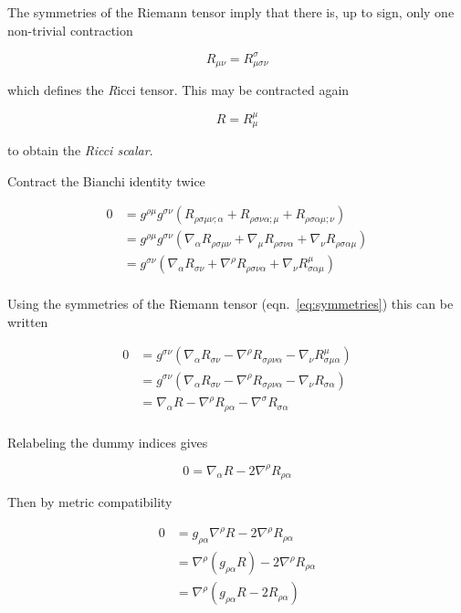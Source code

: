 The symmetries of the Riemann tensor imply that there is, up to sign,
only one non-trivial contraction

\begin{equation}
R_{\mu\nu} = R^\sigma_{\mu\sigma\nu}
\end{equation}

which defines the {\emph Ricci tensor}.  This may be contracted again

\begin{equation}
R = R^\mu_\mu
\end{equation}

to obtain the \emph{Ricci scalar}.


Contract the Bianchi identity twice

\begin{align*}
0 &=
g^{\rho\mu} g^{\sigma\nu}
\left(R_{\rho\sigma\mu\nu;\alpha}
+R_{\rho\sigma\nu\alpha;\mu}
+R_{\rho\sigma\alpha\mu;\nu}\right) \\
&= g^{\rho\mu} g^{\sigma\nu}
\left(\nabla_\alpha R_{\rho\sigma\mu\nu}
+ \nabla_\mu R_{\rho\sigma\nu\alpha}
+ \nabla_\nu R_{\rho\sigma\alpha\mu}\right) \\
&= g^{\sigma\nu}
\left(\nabla_\alpha R_{\sigma\nu}
+ \nabla^\rho R_{\rho\sigma\nu\alpha}
+ \nabla_\nu R^\mu_{\sigma\alpha\mu}\right) \\
\end{align*}

Using the symmetries of the Riemann tensor (eqn.~\ref{eq:symmetries})
this can be written

\begin{align*}
0 &= g^{\sigma\nu}
\left(\nabla_\alpha R_{\sigma\nu}
- \nabla^\rho R_{\sigma\rho\nu\alpha}
- \nabla_\nu R^\mu_{\sigma\mu\alpha}\right) \\
&= g^{\sigma\nu}
\left(\nabla_\alpha R_{\sigma\nu}
- \nabla^\rho R_{\sigma\rho\nu\alpha}
- \nabla_\nu R_{\sigma\alpha}\right) \\
&= \nabla_\alpha R
- \nabla^\rho R_{\rho\alpha}
- \nabla^\sigma R_{\sigma\alpha} \\
\end{align*}

Relabeling the dummy indices gives

\begin{equation*}
0 = \nabla_\alpha R - 2 \nabla^\rho R_{\rho\alpha}
\end{equation*}

Then by metric compatibility

\begin{align*}
0 &= g_{\rho\alpha} \nabla^\rho R - 2 \nabla^\rho R_{\rho\alpha} \\
&= \nabla^\rho (g_{\rho\alpha} R) - 2 \nabla^\rho R_{\rho\alpha} \\
&= \nabla^\rho \left(g_{\rho\alpha} R - 2 R_{\rho\alpha} \right)
\end{align*}

